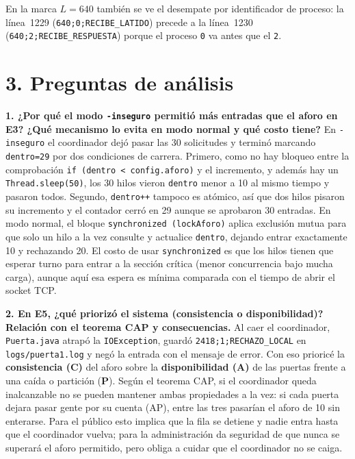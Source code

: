 \documentclass[10pt,a4paper]{article}
\begin{document}
En la marca $L=640$ también se ve el desempate por identificador de proceso: la línea~1229 (\texttt{640;0;RECIBE\_LATIDO}) precede a la línea~1230 (\texttt{640;2;RECIBE\_RESPUESTA}) porque el proceso \texttt{0} va antes que el \texttt{2}.

\section*{3. Preguntas de análisis}
\vspace{-0.15cm}

\textbf{1. ¿Por qué el modo \texttt{-inseguro} permitió más entradas que el aforo en E3? ¿Qué mecanismo lo evita en modo normal y qué costo tiene?}
En \texttt{-inseguro} el coordinador dejó pasar las 30 solicitudes y terminó marcando \texttt{dentro=29} por dos condiciones de carrera. Primero, como no hay bloqueo entre la comprobación \texttt{if (dentro < config.aforo)} y el incremento, y además hay un \texttt{Thread.sleep(50)}, los 30 hilos vieron \texttt{dentro} menor a 10 al mismo tiempo y pasaron todos. Segundo, \texttt{dentro++} tampoco es atómico, así que dos hilos pisaron su incremento y el contador cerró en 29 aunque se aprobaron 30 entradas. En modo normal, el bloque \texttt{synchronized (lockAforo)} aplica exclusión mutua para que solo un hilo a la vez consulte y actualice \texttt{dentro}, dejando entrar exactamente 10 y rechazando 20. El costo de usar \texttt{synchronized} es que los hilos tienen que esperar turno para entrar a la sección crítica (menor concurrencia bajo mucha carga), aunque aquí esa espera es mínima comparada con el tiempo de abrir el socket TCP.

\textbf{2. En E5, ¿qué priorizó el sistema (consistencia o disponibilidad)? Relación con el teorema CAP y consecuencias.}
Al caer el coordinador, \texttt{Puerta.java} atrapó la \texttt{IOException}, guardó \texttt{2418;1;RECHAZO\_LOCAL} en \texttt{logs/puerta1.log} y negó la entrada con el mensaje de error. Con eso prioricé la \textbf{consistencia (C)} del aforo sobre la \textbf{disponibilidad (A)} de las puertas frente a una caída o partición (\textbf{P}). Según el teorema CAP, si el coordinador queda inalcanzable no se pueden mantener ambas propiedades a la vez: si cada puerta dejara pasar gente por su cuenta (AP), entre las tres pasarían el aforo de 10 sin enterarse. Para el público esto implica que la fila se detiene y nadie entra hasta que el coordinador vuelva; para la administración da seguridad de que nunca se superará el aforo permitido, pero obliga a cuidar que el coordinador no se caiga.
\end{document}
